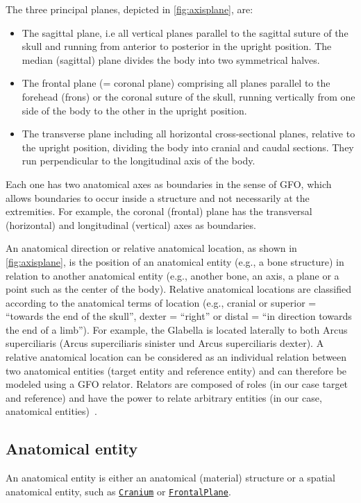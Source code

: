 \documentclass[sw]{iosart2x}
\newcommand{\anno}[1]{\href{https://annosaxfdm.de/ontology/#1}{\texttt{#1}}}
\begin{document}
The three principal planes, depicted in \cref{fig:axisplane}, are:
\begin{itemize}
\item The sagittal plane, i.e all vertical planes parallel to the sagittal suture of the skull and running from anterior to posterior in the upright position.
The median (sagittal) plane divides the body into two symmetrical halves.
\item The frontal plane (= coronal plane) comprising all planes parallel to the forehead (frons) or the coronal suture of the skull, running vertically from one side of the body to the other in the upright position.
\item The transverse plane including all horizontal cross-sectional planes, relative to the upright position, dividing the body into cranial and caudal sections.
They run perpendicular to the longitudinal axis of the body.
\end{itemize}

Each one has two anatomical axes as boundaries in the sense of GFO, which allows boundaries to occur inside a structure and not necessarily at the extremities.
For example, the coronal (frontal) plane has the transversal (horizontal) and longitudinal (vertical) axes as boundaries.

An anatomical direction or relative anatomical location, as shown in \cref{fig:axisplane}, is the position of an anatomical entity (e.g., a bone structure) in relation to another anatomical entity (e.g., another bone, an axis, a plane or a point such as the center of the body).
Relative anatomical locations are classified according to the anatomical terms of location (e.g., cranial or superior = \enquote{towards the end of the skull}, dexter = \enquote{right} or distal = \enquote{in direction towards the end of a limb}).
For example, the Glabella is located laterally to both Arcus superciliaris (Arcus superciliaris sinister und Arcus superciliaris dexter).
A relative anatomical location can be considered as an individual relation between two anatomical entities (target entity and reference entity) and can therefore be modeled using a GFO relator.
Relators are composed of roles (in our case target and reference) and have the power to relate arbitrary entities (in our case, anatomical entities)~\citep{gfocategory}.


\subsection{Anatomical entity}
An anatomical entity is either an anatomical (material) structure or a spatial anatomical entity, such as \anno{Cranium} or \anno{FrontalPlane}.
\end{document}
